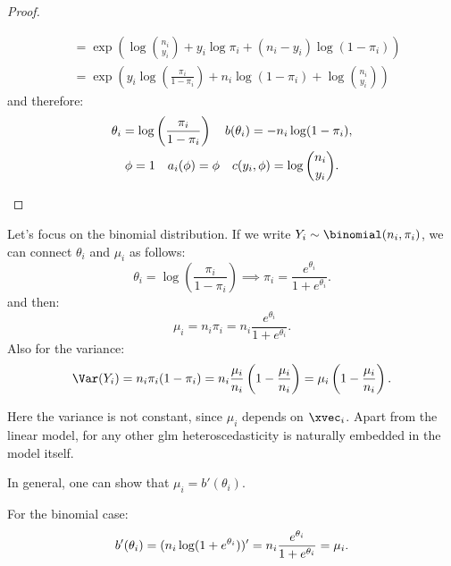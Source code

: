 \begin{proof}
\begin{description}
\begin{equation}
\begin{aligned}
                                         & = \exp\left(\log\binom{n_i}{y_i} + y_i \log\pi_i + (n_i - y_i)\log(1-\pi_i)\right)                           \\
                                         & = \exp\left(y_i \log\left(\frac{\pi_i}{1 - \pi_i}\right) + n_i \log(1 - \pi_i) + \log\binom{n_i}{y_i}\right)
                  \end{aligned}
              \end{equation}
              and therefore:
              \begin{equation}
                \begin{gathered}
                    \theta_i = \log\left(\frac{\pi_i}{1 - \pi_i}\right)\quad b(\theta_i) = -n_i \log(1 - \pi_i),\\ 
                    \phi = 1\quad a_i(\phi) = \phi\quad c(y_i, \phi) = \log\binom{n_i}{y_i}.
                \end{gathered}\vspace{-1em}
              \end{equation}
              \qedhere
    \end{description}
\end{proof}

Let's focus on the binomial distribution. If we write $Y_i \sim \binomial(n_i, \pi_i)$, we can connect $\theta_i$ and $\mu_i$ as follows:
\begin{equation}
    \theta_i = \log\left(\frac{\pi_i}{1 - \pi_i}\right) \implies \pi_i = \frac{e^{\theta_i}}{1 + e^{\theta_i}}.
\end{equation}
and then:
\begin{equation}
    \mu_i = n_i\pi_i = n_i \frac{e^{\theta_i}}{1 + e^{\theta_i}}.
\end{equation}
Also for the variance:
\begin{equation}
    \Var(Y_i) = n_i\pi_i(1 - \pi_i) = n_i \frac{\mu_i}{n_i}\left(1 - \frac{\mu_i}{n_i}\right) = \mu_i\left(1 - \frac{\mu_i}{n_i}\right).
\end{equation}

\begin{note}
    Here the variance is not constant, since $\mu_i$ depends on $\xvec_i$. Apart from the linear model, for any other \acs{glm} heteroscedasticity is naturally embedded in the model itself.
\end{note}

In general, one can show that $\mu_i = b'(\theta_i)$.

\begin{example}
    For the binomial case:
    \begin{equation}
        b'(\theta_i) = (n_i \log(1 + e^{\theta_i}))' = n_i \frac{e^{\theta_i}}{1 + e^{\theta_i}} = \mu_i.\qedhere
    \end{equation}
\end{example}


